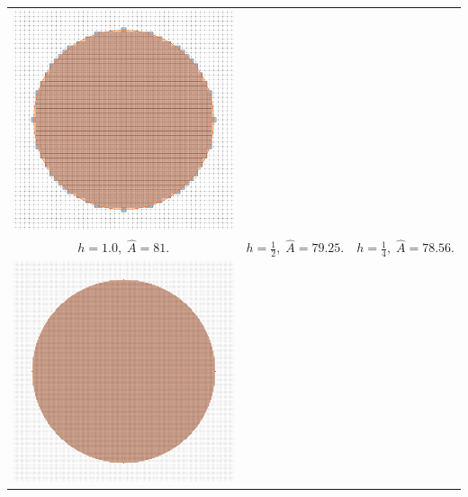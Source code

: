 \begin{frame}
\begin{tabular}{ccc}
\includegraphics[scale=0.4]{figures/digital-estimators/multigrid/h025.png} \\
$h=1.0,\; \widehat{A}=81.$ & $h=\frac{1}{2},\; \hat{A}=79.25.$ & $h=\frac{1}{4},\; \hat{A}=78.56.$\\[1em]
\includegraphics[scale=0.4]{figures/digital-estimators/multigrid/h00625.png} &

\end{tabular}
\end{frame}
